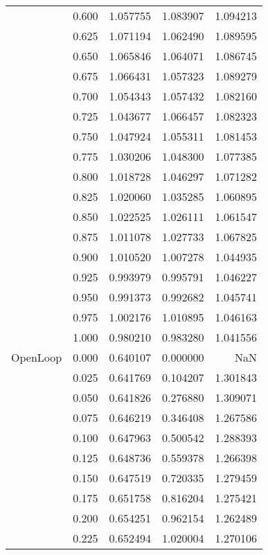\begin{tabular}{llrrr}
         & 0.600 &   1.057755 &   1.083907 &   1.094213 \\
         & 0.625 &   1.071194 &   1.062490 &   1.089595 \\
         & 0.650 &   1.065846 &   1.064071 &   1.086745 \\
         & 0.675 &   1.066431 &   1.057323 &   1.089279 \\
         & 0.700 &   1.054343 &   1.057432 &   1.082160 \\
         & 0.725 &   1.043677 &   1.066457 &   1.082323 \\
         & 0.750 &   1.047924 &   1.055311 &   1.081453 \\
         & 0.775 &   1.030206 &   1.048300 &   1.077385 \\
         & 0.800 &   1.018728 &   1.046297 &   1.071282 \\
         & 0.825 &   1.020060 &   1.035285 &   1.060895 \\
         & 0.850 &   1.022525 &   1.026111 &   1.061547 \\
         & 0.875 &   1.011078 &   1.027733 &   1.067825 \\
         & 0.900 &   1.010520 &   1.007278 &   1.044935 \\
         & 0.925 &   0.993979 &   0.995791 &   1.046227 \\
         & 0.950 &   0.991373 &   0.992682 &   1.045741 \\
         & 0.975 &   1.002176 &   1.010895 &   1.046163 \\
         & 1.000 &   0.980210 &   0.983280 &   1.041556 \\
OpenLoop & 0.000 &   0.640107 &   0.000000 &        NaN \\
         & 0.025 &   0.641769 &   0.104207 &   1.301843 \\
         & 0.050 &   0.641826 &   0.276880 &   1.309071 \\
         & 0.075 &   0.646219 &   0.346408 &   1.267586 \\
         & 0.100 &   0.647963 &   0.500542 &   1.288393 \\
         & 0.125 &   0.648736 &   0.559378 &   1.266398 \\
         & 0.150 &   0.647519 &   0.720335 &   1.279459 \\
         & 0.175 &   0.651758 &   0.816204 &   1.275421 \\
         & 0.200 &   0.654251 &   0.962154 &   1.262489 \\
         & 0.225 &   0.652494 &   1.020004 &   1.270106 \\

\end{tabular}
